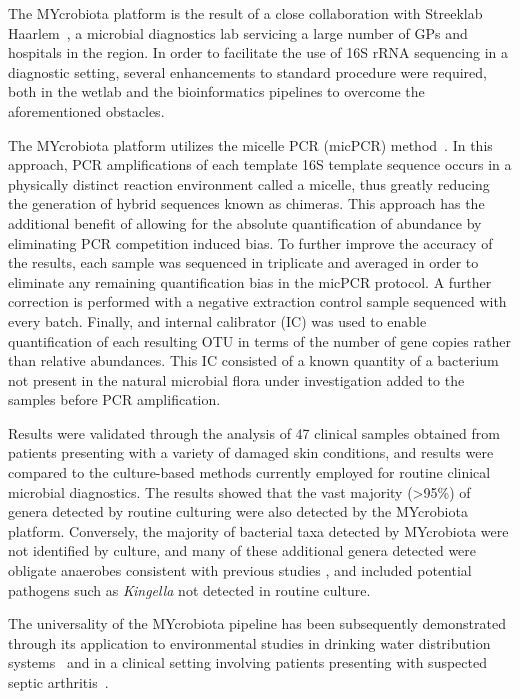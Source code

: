 The MYcrobiota platform is the result of a close collaboration with Streeklab Haarlem~\cite{TODO}, a microbial diagnostics lab servicing a large number of GPs and hospitals in the region. In order to facilitate the use of 16S rRNA sequencing in a diagnostic setting, several enhancements to standard procedure were required, both in the wetlab and the bioinformatics pipelines to overcome the aforementioned obstacles.

The MYcrobiota platform utilizes the micelle PCR (micPCR) method~\cite{boers2015micelle,boers2017novel}. In this approach, PCR amplifications of each template 16S template sequence occurs in a physically distinct reaction environment called a micelle, thus greatly reducing the generation of hybrid sequences known as chimeras. This approach has the additional benefit of allowing for the absolute quantification of abundance by eliminating PCR competition induced bias. To further improve the accuracy of the results, each sample was sequenced in triplicate and averaged in order to eliminate any remaining quantification bias in the micPCR protocol. A further correction is performed with a negative extraction control sample sequenced with every batch. Finally, and internal calibrator (IC) was used to enable quantification of each resulting OTU in terms of the number of gene copies rather than relative abundances. This IC consisted of a known quantity of a bacterium not present in the natural microbial flora under investigation added to the samples before PCR amplification.

Results were validated through the analysis of 47 clinical samples obtained from patients presenting with a variety of damaged skin conditions, and results were compared to the culture-based methods currently employed for routine clinical microbial diagnostics. The results showed that the vast majority (>95\%) of genera detected by routine culturing were also detected by the MYcrobiota platform. Conversely, the majority of bacterial taxa detected by MYcrobiota were not identified by culture, and many of these additional genera detected were obligate anaerobes consistent with previous studies \cite{TODO}, and included potential pathogens such as \emph{Kingella} not detected in routine culture.

The universality of the MYcrobiota pipeline has been subsequently demonstrated through its application to environmental studies in drinking water distribution systems~\cite{boers2018monitoring} and in a clinical setting involving patients presenting with suspected septic arthritis~\cite{boers2018detection}.

